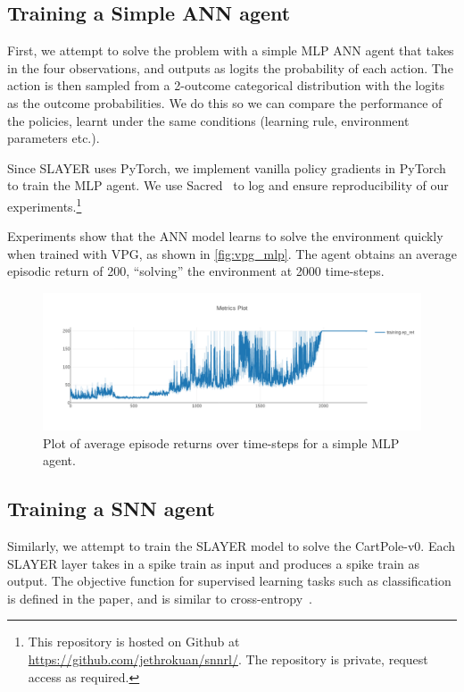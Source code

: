 \documentclass[fyp]{socreport}
\begin{document}
\subsection{Training a Simple ANN agent}

First, we attempt to solve the problem with a simple MLP ANN agent that takes in
the four observations, and outputs as logits the probability of each action. The
action is then sampled from a 2-outcome categorical distribution with the logits
as the outcome probabilities. We do this so we can compare the performance of
the policies, learnt under the same conditions (learning rule, environment
parameters etc.).

Since SLAYER uses PyTorch, we implement vanilla policy gradients in PyTorch to
train the MLP agent. We use Sacred~\cite{klaus_greff-proc-scipy-2017} to log and
ensure reproducibility of our experiments.\footnote{This repository is hosted on
Github at \url{https://github.com/jethrokuan/snnrl/}. The repository is private,
request access as required.}

Experiments show that the ANN model learns to solve the environment quickly when
trained with VPG, as shown in \autoref{fig:vpg_mlp}. The agent obtains an
average episodic return of 200, ``solving'' the environment at 2000 time-steps.

\begin{figure}[htbp] \centering
\includegraphics[width=.9\linewidth]{images/vpg_mlp.png}
\caption{\label{fig:vpg_mlp} Plot of average episode returns over time-steps for
a simple MLP agent.}
\end{figure}

\subsection{Training a SNN agent}

Similarly, we attempt to train the SLAYER model to solve the CartPole-v0. Each
SLAYER layer takes in a spike train as input and produces a spike train as
output. The objective function for supervised learning tasks such as
classification is defined in the paper, and is similar to
cross-entropy~\cite{NIPS2018_7415}.
\end{document}

